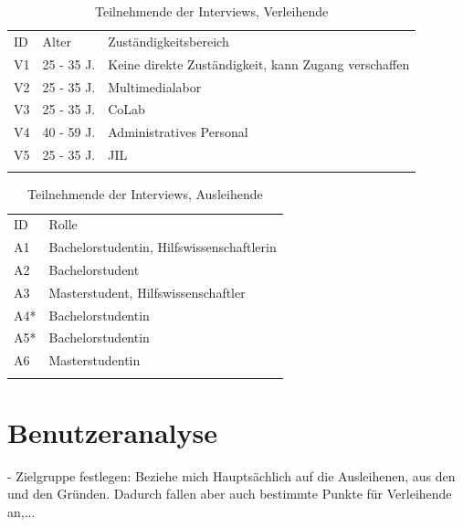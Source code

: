 \begin{table}[h]
    \centering
    \caption{Teilnehmende der Interviews, Verleihende}
    \begin{tabular}{lll}
        \arrayrulecolor{maincolor}\hline
        \sffamily\color{maincolor}ID & \sffamily\color{maincolor}Alter &
        \sffamily\color{maincolor}Zuständigkeitsbereich \\
        \arrayrulecolor{maincolor}\hline
            V1 & 25 - 35 J. & Keine direkte Zuständigkeit, kann Zugang verschaffen\\
            V2 & 25 - 35 J. & Multimedialabor\\
            V3 & 25 - 35 J. & CoLab\\
            V4 & 40 - 59 J. & Administratives Personal\\
            V5 & 25 - 35 J. & JIL\\
            \arrayrulecolor{maincolor}\hline
    \end{tabular}  
    \label{table:v}
\end{table}

\begin{table}[h]
    \centering 
    \caption{Teilnehmende der Interviews, Ausleihende}
    \begin{tabular}{ll}
        \arrayrulecolor{maincolor}\hline
        \sffamily\color{maincolor}ID & \sffamily\color{maincolor}Rolle \\
        \arrayrulecolor{maincolor}\hline
            A1  & Bachelorstudentin, Hilfswissenschaftlerin\\
            A2 &  Bachelorstudent\\
            A3  & Masterstudent, Hilfswissenschaftler \\
            A4*  & Bachelorstudentin \\
            A5*  & Bachelorstudentin \\
            A6  & Masterstudentin \\
        \arrayrulecolor{maincolor}\hline
    \end{tabular}
    \label{table:a}
    \hfill
    
\end{table}

\section{Benutzeranalyse}
\label{section:benutzer}
- Zielgruppe festlegen: Beziehe mich Hauptsächlich auf die Ausleihenen, aus den und den Gründen.
Dadurch fallen aber auch bestimmte Punkte für Verleihende an,...

